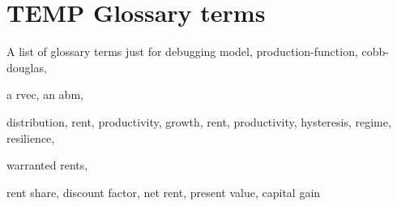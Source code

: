 \section{TEMP Glossary terms}

A list of glossary terms just for debugging
\gls{model}, 
\gls{production-function}, 
\gls{cobb-douglas}, 

a \gls{rvec}, 
an \gls{abm}, 

\gls{distribution},
\gls{rent}, 
\gls{productivity}, 
\gls{growth}, 
\gls{rent}, 
\gls{productivity}, 
\gls{hysteresis}, 
\gls{regime}, 
\gls{resilience}, 


\gls{warranted rents}, 

\gls{rent share},
\Gls{discount factor},
\gls{net rent}, 
\gls{present value}, 
\gls{capital gain}